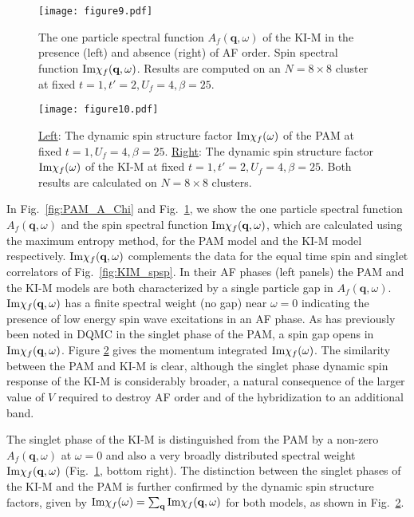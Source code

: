 \documentclass[pra,letterpaper,10pt,twocolumn]{revtex4}
\begin{document}
\begin{figure}[!h]
\texttt{[image: figure9.pdf]} 
\caption{
The one particle spectral function $A_f(\textbf{q}, \omega)$ of the
KI-M in the
presence (left) and absence (right) of AF order. 
Spin spectral function $ \textup{Im}\chi_f(\textbf{q}, \omega)$. Results
are computed on an $N=8\times 8$ cluster at fixed
$t=1, t'=2, U_f=4, \beta=25$.
\label{fig:MPAM_A_Chi}
}
\end{figure}

\begin{figure}[!h]
\texttt{[image: figure10.pdf]} 
\caption{
\underline{Left}: The dynamic spin structure factor $ \textup{Im}\chi_f(\omega)$ of the 
PAM at fixed $t=1, U_f=4, \beta=25$.
\underline{Right}: The dynamic spin structure factor $ \textup{Im}\chi_f(\omega)$ of the KI-M at fixed $t=1, t'=2, U_f=4, \beta=25$. Both results are calculated on $N=8\times 8$ clusters.
\label{fig:MPAM_Chi}
}
\end{figure}

\vskip0.10in
In Fig.~\ref{fig:PAM_A_Chi} and
Fig.~\ref{fig:MPAM_A_Chi}, we show the one particle spectral
function $A_f(\textbf{q}, \omega)$ and the spin spectral function $ \textup{Im}\chi_f(\textbf{q},
\omega)$, which are calculated using the maximum entropy
method\citep{Gubernatis, Beach}, for the PAM model and the KI-M model
respectively. $\textup{Im}\chi_f(\textbf{q},\omega)$ complements the data
for the equal time spin and singlet correlators of Fig.~\ref{fig:KIM_spsp}.
In their AF phases (left panels) 
the PAM and the KI-M models are both characterized by
a single particle gap in $A_f(\textbf{q}, \omega)$.
$ \textup{Im}\chi_f(\textbf{q},\omega)$ has a finite spectral weight
(no gap) near 
$\omega=0$ indicating the presence of low energy spin wave excitations in
an AF phase. 
As has previously been noted in DQMC\cite{Vekic95} 
in the singlet phase of the PAM, 
a spin gap opens in $ \textup{Im}\chi_f(\textbf{q},\omega)$.
Figure \ref{fig:MPAM_Chi} gives the momentum integrated
$ \textup{Im}\chi_f(\omega)$.  The similarity between the PAM and KI-M
is clear, although the singlet phase dynamic spin response
of the KI-M is considerably broader, a natural consequence of the larger 
value of $V$ required to destroy AF order and of the
hybridization to an additional band.

The singlet phase of the KI-M is distinguished from the PAM 
by a non-zero  $A_f(\textbf{q},
\omega)$ at $\omega=0$
and also a very broadly distributed spectral weight $ \textup{Im}\chi_f(\textbf{q},\omega)$
(Fig.~\ref{fig:MPAM_A_Chi}, bottom right).
The distinction between the singlet phases of the KI-M and the PAM is further confirmed by the dynamic spin structure factors, given by $ \textup{Im}\chi_f(\omega) = \sum_{\textbf{q}}  \textup{Im}\chi_f(\textbf{q},\omega)$ for both models, as shown in Fig.~\ref{fig:MPAM_Chi}.
\end{document}
